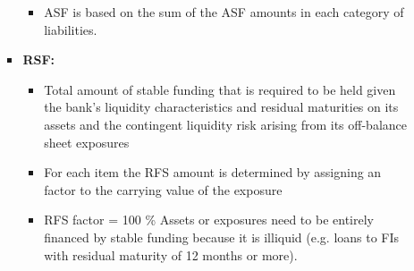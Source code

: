 \documentclass[a4paper,12pt]{article}
\begin{document}
\begin{enumerate}
\begin{itemize}
\begin{itemize}
\begin{itemize}
						\item ASF is based on the sum of the ASF amounts in each category of liabilities.
					\end{itemize}

				\item \textbf{RSF:}
					\begin{itemize}
							\item Total amount of stable funding that is required to be held given the bank's liquidity characteristics and residual maturities on its assets and the contingent liquidity risk arising from its off-balance sheet exposures

							\item For each item the RFS amount is determined by assigning an factor to the carrying value of the exposure

							\item RFS factor = 100 \% Assets or exposures need to be entirely financed by stable funding because it is illiquid (e.g. loans to FIs with residual maturity of 12 months or more). 
						\end{itemize}
			\end{itemize}

		\end{itemize}
\end{enumerate}

\newpage

\end{document}
